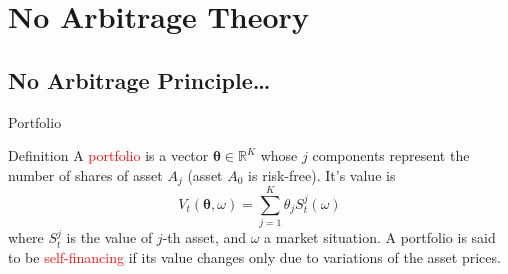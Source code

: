 \documentclass{beamer}
\begin{document}
\section{No Arbitrage Theory}
\subsection{No Arbitrage Principle\ldots}

%  
%

\begin{frame}{Portfolio}
	\begin{block}{Definition}
		A \textcolor{red}{portfolio} is a vector $\mathbf{\theta}\in \mathbb{R}^K$ whose $j$ components represent the number of shares of asset $A_j$ (asset $A_0$ is risk-free). It's value is
		\begin{equation}
			V_t(\mathbf{\theta}, \omega)=\sum_{j=1}^K\theta_jS^j_t(\omega)
		\end{equation} 
		where $S_t^j$ is the value of $j$-th asset, and $\omega$ a market situation. A portfolio is said to be \textcolor{red}{self-financing} if its value changes only due to variations of the asset prices.
	\end{block}
\end{frame}
\end{document}
